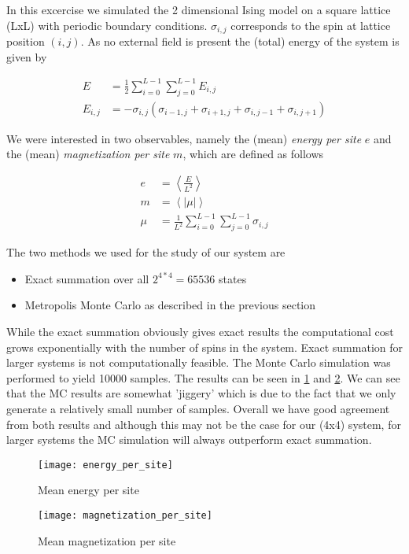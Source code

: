 \documentclass[a4paper,11pt,bibtotoc]{scrartcl}
\begin{document}
In this excercise we simulated the 2 dimensional Ising model on a square lattice
(LxL) with periodic boundary conditions. $\sigma_{i,j}$ corresponds to the spin
at lattice position $(i,j)$. As no external field is present the (total) energy
of the system is given by

\begin{align}
  E &= \frac{1}{2} \sum_{i=0}^{L-1} \sum_{j=0}^{L-1} E_{i,j} \\
  E_{i,j} &= -\sigma_{i,j} \left(\sigma_{i-1,j} + \sigma_{i+1,j} + \sigma_{i,j-1} + \sigma_{i,j+1} \right)
\end{align}

We were interested in two observables, namely the (mean) \textit{energy per site} $e$
and the (mean) \textit{magnetization per site} $m$, which are defined as follows

\begin{align}
  e &= \left\langle \frac{E}{L^2} \right\rangle \\
  m &= \left\langle \left| \mu \right| \right \rangle \\
  \mu &= \frac{1}{L^2} \sum_{i=0}^{L-1} \sum_{j=0}^{L-1} \sigma_{i,j}
\end{align}

The two methods we used for the study of our system are
\begin{itemize}
  \item Exact summation over all $2^{4*4}=65536$ states
  \item Metropolis Monte Carlo as described in the previous section
\end{itemize}

While the exact summation obviously gives exact results the computational cost grows
exponentially with the number of spins in the system.
Exact summation for larger systems is not computationally feasible.
The Monte Carlo simulation was performed to yield 10000 samples.
The results can be seen in \cref{fig:energy_per_site} and \cref{fig:magnetization_per_site}.
We can see that the MC results are somewhat 'jiggery' which is due to the fact that we only generate
a relatively small number of samples.
Overall we have good agreement from both results and although this may not be the case for our
(4x4) system, for larger systems the MC simulation will always outperform exact summation.
    
\begin{figure}[htb]
  \centering
  \texttt{[image: energy\_per\_site]}
  \caption{Mean energy per site}
  \label{fig:energy_per_site}
\end{figure}

\begin{figure}[htb]
  \centering
  \texttt{[image: magnetization\_per\_site]}
  \caption{Mean magnetization per site}
  \label{fig:magnetization_per_site}
\end{figure}
\end{document}
